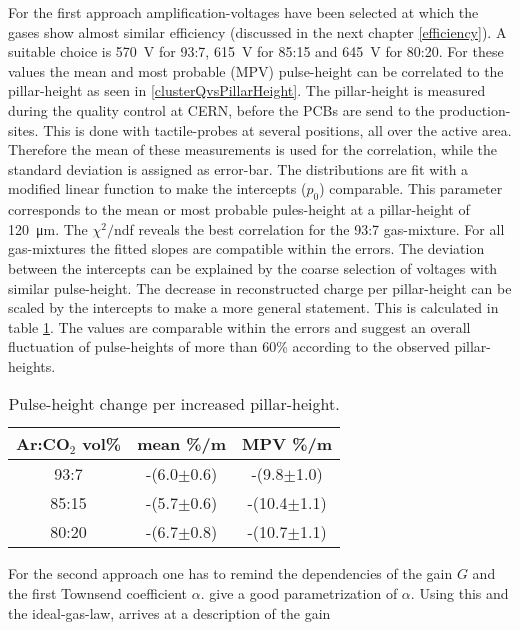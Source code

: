 \documentclass[
twoside,            %
BCOR1.4cm,          %
10pt,               %
headings=normal,    %
headsepline,        %
clearplainpage,		%
final,              %
div=14,
open=right,
bibliography=toc
]{scrreprt}
\begin{document}
For the first approach amplification-voltages have been selected at which the gases show almost similar efficiency (discussed in the next chapter \ref{efficiency}).
A suitable choice is \SI{570}{V} for 93:7, \SI{615}{V} for 85:15 and \SI{645}{V} for 80:20.
For these values the mean and most probable (MPV) pulse-height can be correlated to the pillar-height as seen in \ref{clusterQvsPillarHeight}.
The pillar-height is measured during the quality control at CERN, before the PCBs are send to the production-sites.
This is done with tactile-probes at several positions, all over the active area.
Therefore the mean of these measurements is used for the correlation, while the standard deviation is assigned as error-bar.
The distributions are fit with a modified linear function to make the intercepts ($p_{0}$) comparable.
This parameter corresponds to the mean or most probable pules-height at a pillar-height of \SI{120}{\micro m}.
The $\chi^{2}/$ndf reveals the best correlation for the 93:7 gas-mixture.
For all gas-mixtures the fitted slopes are compatible within the errors.
The deviation between the intercepts can be explained by the coarse selection of voltages with similar pulse-height.
The decrease in reconstructed charge per pillar-height can be scaled by the intercepts to make a more general statement.
This is calculated in table \ref{pusleHeightChange}.
The values are comparable within the errors and suggest an overall fluctuation of pulse-heights of more than 60\% according to the observed pillar-heights.

\begin{table}[!h]
	\centering	
	\begin{tabular}{ccc}
		\hline
		\hline
		Ar:CO$_{2}$ vol\% & mean \%/\textmu m & MPV \%/\textmu m
		\\
		\hline
		93:7 & -(6.0$\pm$0.6) & -(9.8$\pm$1.0)
		\\
		85:15 & -(5.7$\pm$0.6) & -(10.4$\pm$1.1)
		\\
		80:20 & -(6.7$\pm$0.8) & -(10.7$\pm$1.1)
		\\
		\hline
		\hline
	\end{tabular}
	\caption{
		Pulse-height change per increased pillar-height.
	}
	\label{pusleHeightChange} 
\end{table}

For the second approach one has to remind the dependencies of the gain $G$ and the first Townsend coefficient $\alpha$.
\cite{roseNkorff} give a good parametrization of $\alpha$.
Using this and the ideal-gas-law, \cite{micromegasHadronicCalormetry} arrives at a description of the gain
\end{document}
